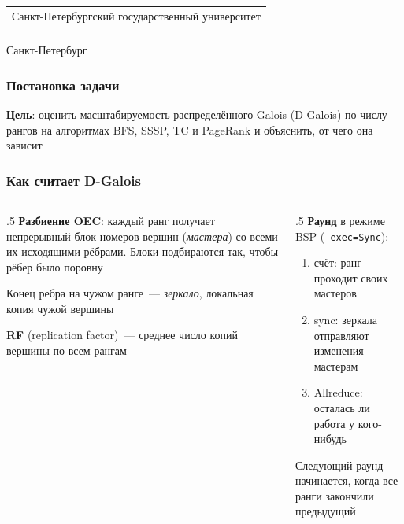 \documentclass
  [ russian
  , aspectratio=1610
  ] {beamer}
\title[Масштабируемость D-Galois]{\my@title@title@ru}
\author[\my@title@author@ru]{\my@title@author@ru, группа \academicGroup}
\institute[СПбГУ]{}
\date[2026]{}
\makeatletter
\newcommand{\advisorChair}{\my@title@chair@ru}
\newcommand{\defenseYear}{\my@title@year@ru}
\makeatother
\begin{document}
{

\begin{frame}
    \vspace{15pt}
    \begin{center}
        \begin{tabular}{c}
            \scriptsize{Санкт-Петербургский государственный университет} \\
            \scriptsize{\advisorChair}
        \end{tabular}
        \titlepage
    \end{center}

    \btVFill

    \begin{center}
        \vspace{5pt}
        \scriptsize{Санкт-Петербург\\ \defenseYear}
    \end{center}
\end{frame}
}

\begin{frame}
    \frametitle{Постановка задачи}
    \textbf{Цель}: оценить масштабируемость распределённого Galois (D-Galois)
    по числу рангов на алгоритмах BFS, SSSP, TC и PageRank
    и объяснить, от чего она зависит
\end{frame}

\begin{frame}
    \frametitle{Как считает D-Galois}
    \begin{columns}[T]
        \begin{column}{.5\textwidth}
            \textbf{Разбиение OEC}: каждый ранг получает непрерывный блок номеров вершин
            (\emph{мастера}) со всеми их исходящими рёбрами. Блоки подбираются так, чтобы рёбер
            было поровну

            \medskip
            Конец ребра на чужом ранге~--- \emph{зеркало}, локальная копия чужой вершины

            \medskip
            \textbf{RF} (replication factor)~--- среднее число копий вершины по всем рангам
        \end{column}
        \begin{column}{.5\textwidth}
            \textbf{Раунд} в режиме BSP (\texttt{--exec=Sync}):
            \begin{enumerate}
                \item счёт: ранг проходит своих мастеров
                \item sync: зеркала отправляют изменения мастерам
                \item Allreduce: осталась ли работа у кого-нибудь
            \end{enumerate}

            \medskip
            Следующий раунд начинается, когда все ранги закончили предыдущий
        \end{column}
    \end{columns}
\end{frame}
\end{document}
